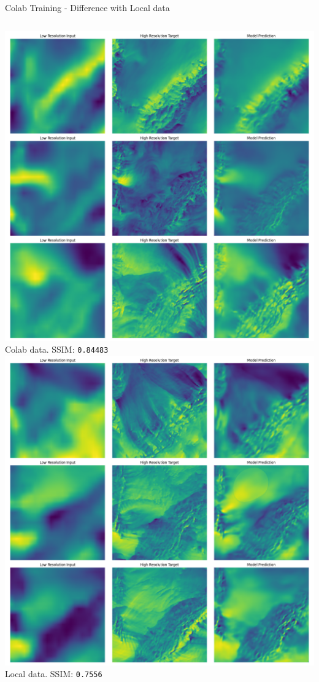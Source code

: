 \documentclass[footline=authortitle]{beamer}
\begin{document}
\begin{frame}{Colab Training - Difference with Local data}
    \begin{columns}
            \includegraphics[width=\linewidth]{images/colab_vector_unet_L1SSIM_loss_300_epochs_8_batch_1em3_lr_1em5_weightdecay_best.pt.png}
            \newline
            \centering \small Colab data. SSIM: \texttt{0.84483}
            \includegraphics[width=\linewidth]{images/unet_vectors_l1ssim_loss_200_epochs_4_batch_1em3_lr_1em5_weightdecay.png}
            \newline
            \centering \small Local data. SSIM: \texttt{0.7556}
    \end{columns}
\end{frame}
\end{document}
